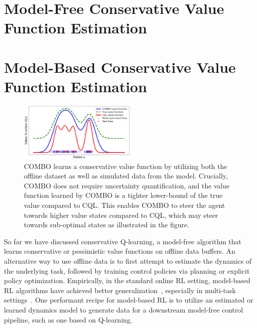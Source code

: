 \documentclass[../thesis.tex]{subfiles}
\begin{document}

\section{Model-Free Conservative Value Function Estimation}


% 





\section{Model-Based Conservative Value Function Estimation}

\begin{figure}[t!]
    \centering
    \includegraphics[width=0.5\textwidth]{chapters/combo/teaser_combo.png}
    \vspace*{-0.5cm}
    \caption{COMBO learns a conservative value function by utilizing both the offline dataset as well as simulated data from the model. Crucially, COMBO does not require uncertainty quantification, and the value function learned by COMBO is a tighter lower-bound of the true value compared to CQL. This enables COMBO to steer the agent towards higher value states compared to CQL, which may steer towards sub-optimal states as illustrated in the figure.}
    \vspace*{-0.6cm}
    \label{fig:combo_teaser}
\end{figure}

So far we have discussed conservative Q-learning, a model-free algorithm that learns conservative or pessimistic value functions on offline data buffers. An alternative way to use offline data is to first attempt to estimate the dynamics of the underlying task, followed by training control policies via planning or explicit policy optimization. Empirically, in the standard online RL setting, model-based RL algorithms have achieved better generalization~\citep{sutton1991dyna,janner2019mbpo}, especially in multi-task settings~\citep{}. One performant recipe for model-based RL is to utilize an estimated or learned dynamics model to generate data for a downstream model-free control pipeline, such as one based on Q-learning. 
\end{document}
